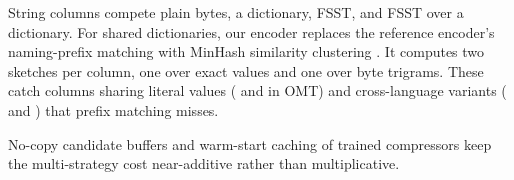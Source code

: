 String columns compete plain bytes, a dictionary, FSST, and FSST over a dictionary.
For shared dictionaries, our encoder replaces the reference encoder's naming-prefix matching with MinHash similarity clustering \citep{broderResemblanceContainmentDocuments1998}.
It computes two sketches per column, one over exact values and one over byte trigrams.
These catch columns sharing literal values ( and  in \ac{OMT}) and cross-language variants ( and ) that prefix matching misses.

No-copy candidate buffers and warm-start caching of trained compressors keep the multi-strategy cost near-additive rather than multiplicative.
